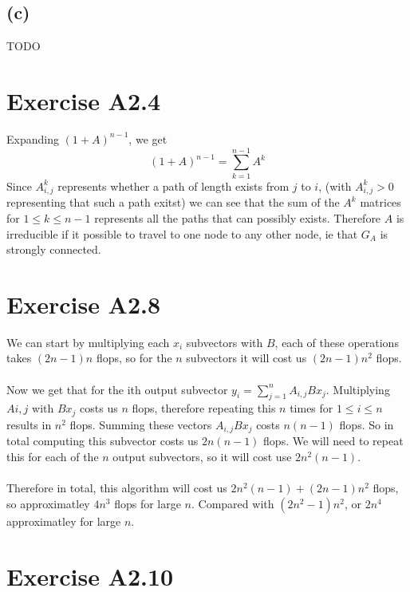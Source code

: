 \subsection*{(c)}
TODO
\section*{Exercise A2.4}
Expanding $(1+A)^{n-1}$, we get
$$
(1+A)^{n-1}=\sum_{k=1}^{n-1}A^k$$
Since $A^k_{i,j}$ represents whether a path of length exists from $j$ to $i$, (with $A^k_{i,j}>0$ representing that such a path exitst)
we can see that the sum of the $A^k$ matrices for $1\leq k \leq n-1$ represents all the paths that can possibly exists. Therefore $A$ is
irreducible if it possible to travel to one node to any other node, ie that $G_A$ is strongly connected.
\section*{Exercise A2.8}
We can start by multiplying each $x_i$ subvectors with $B$, each of these operations takes $(2n-1)n$ flops, so for the $n$ subvectors it will cost us $(2n-1)n^2$ flops.
\\\\Now we get that for the ith output subvector $y_i=\sum_{j=1}^{n}A_{i,j}Bx_j$. Multiplying $A{i,j}$ with $Bx_j$ costs us $n$ flops, therefore repeating this $n$ times for 
$1\leq i \leq n$ results in $n^2$ flops. Summing these vectors $A_{i,j}Bx_j$ costs $n(n-1)$ flops. So in total computing this subvector costs us $2n(n-1)$ flops. We will need to repeat this for each of the $n$ output subvectors, so it will cost use $2n^2(n-1)$.\\\\
Therefore in total, this algorithm will cost us $2n^2(n-1)+(2n-1)n^2$ flops, so approximatley $4n^3$ flops for large $n$. Compared with $(2n^2-1)n^2$, or $2n^4$ approximatley for large $n$.
\section*{Exercise A2.10}
